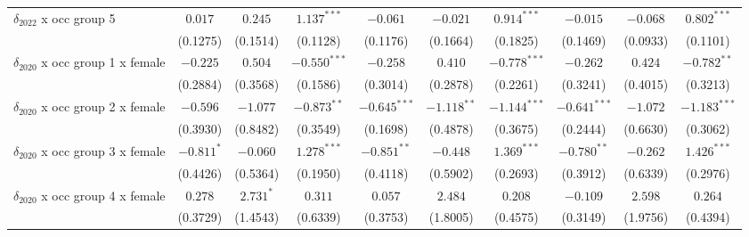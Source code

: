 \begin{tabular}{l|ccc|ccc|ccc|}
$\delta_{2022}$ x occ group 5          &                 $0.017$ &         $0.245$ &   $1.137^{***}$ &                 $-0.061$ &        $-0.021$ &   $0.914^{***}$ &                 $-0.015$ &        $-0.068$ &   $0.802^{***}$ \\
                                       &                (0.1275) &        (0.1514) &        (0.1128) &                 (0.1176) &        (0.1664) &        (0.1825) &                 (0.1469) &        (0.0933) &        (0.1101) \\
$\delta_{2020}$ x occ group 1 x female &                $-0.225$ &         $0.504$ &  $-0.550^{***}$ &                 $-0.258$ &         $0.410$ &  $-0.778^{***}$ &                 $-0.262$ &         $0.424$ &   $-0.782^{**}$ \\
                                       &                (0.2884) &        (0.3568) &        (0.1586) &                 (0.3014) &        (0.2878) &        (0.2261) &                 (0.3241) &        (0.4015) &        (0.3213) \\
$\delta_{2020}$ x occ group 2 x female &                $-0.596$ &        $-1.077$ &   $-0.873^{**}$ &           $-0.645^{***}$ &   $-1.118^{**}$ &  $-1.144^{***}$ &           $-0.641^{***}$ &        $-1.072$ &  $-1.183^{***}$ \\
                                       &                (0.3930) &        (0.8482) &        (0.3549) &                 (0.1698) &        (0.4878) &        (0.3675) &                 (0.2444) &        (0.6630) &        (0.3062) \\
$\delta_{2020}$ x occ group 3 x female &              $-0.811^*$ &        $-0.060$ &   $1.278^{***}$ &            $-0.851^{**}$ &        $-0.448$ &   $1.369^{***}$ &            $-0.780^{**}$ &        $-0.262$ &   $1.426^{***}$ \\
                                       &                (0.4426) &        (0.5364) &        (0.1950) &                 (0.4118) &        (0.5902) &        (0.2693) &                 (0.3912) &        (0.6339) &        (0.2976) \\
$\delta_{2020}$ x occ group 4 x female &                 $0.278$ &       $2.731^*$ &         $0.311$ &                  $0.057$ &         $2.484$ &         $0.208$ &                 $-0.109$ &         $2.598$ &         $0.264$ \\
                                       &                (0.3729) &        (1.4543) &        (0.6339) &                 (0.3753) &        (1.8005) &        (0.4575) &                 (0.3149) &        (1.9756) &        (0.4394) \\

\end{tabular}

